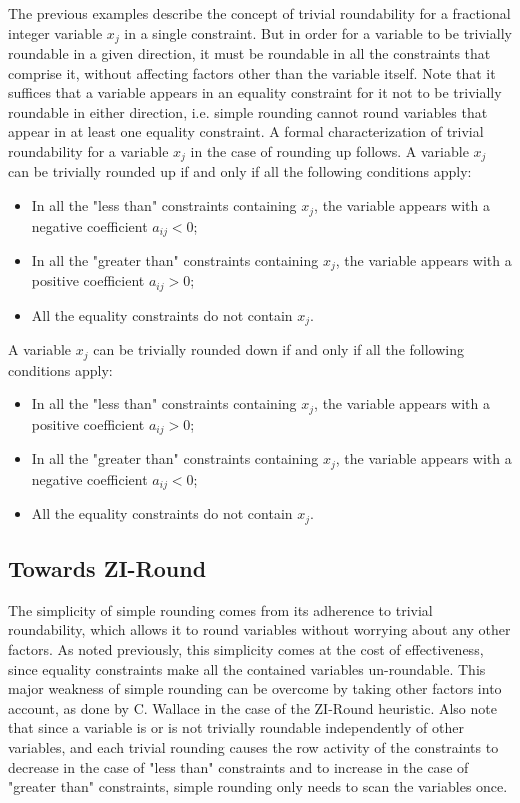 \documentclass[a4paper,12pt,twoside]{scrbook}
\begin{document}
The previous examples describe the concept of trivial roundability for a fractional integer variable $x_j$ in a single constraint. But in order for a variable to be trivially roundable in a given direction, it must be roundable in all the constraints that comprise it, without affecting factors other than the variable itself. 
Note that it suffices that a variable appears in an equality constraint for it not to be trivially roundable in either direction, i.e. simple rounding cannot round variables that appear in at least one equality constraint.
A formal characterization of trivial roundability for a variable $x_j$ in the case of rounding up follows.
A variable $x_j$ can be trivially rounded up if and only if all the following conditions apply:
\begin{itemize}
	\item In all the "less than" constraints containing $x_j$, the variable appears with a negative coefficient $a_{ij} < 0$;
	\item In all the "greater than" constraints containing $x_j$, the variable appears with a positive coefficient $a_{ij} > 0$;
	\item All the equality constraints do not contain $x_j$.
\end{itemize}
A variable $x_j$ can be trivially rounded down if and only if all the following conditions apply:
\begin{itemize}
	\item In all the "less than" constraints containing $x_j$, the variable appears with a positive coefficient $a_{ij} > 0$;
	\item In all the "greater than" constraints containing $x_j$, the variable appears with a negative coefficient $a_{ij} < 0$;
	\item All the equality constraints do not contain $x_j$.
\end{itemize}
\par

\subsection{Towards ZI-Round}
The simplicity of simple rounding comes from its adherence to trivial roundability, which allows it to round variables without worrying about any other factors. As noted previously, this simplicity comes at the cost of effectiveness, since equality constraints make all the contained variables un-roundable. This major weakness of simple rounding can be overcome by taking other factors into account, as done by C. Wallace \cite{wallace2010} in the case of the ZI-Round heuristic. Also note that since a variable is or is not trivially roundable independently of other variables, and each trivial rounding causes the row activity of the constraints to decrease in the case of "less than" constraints and to increase in the case of "greater than" constraints, simple rounding only needs to scan the variables once.
\end{document}
